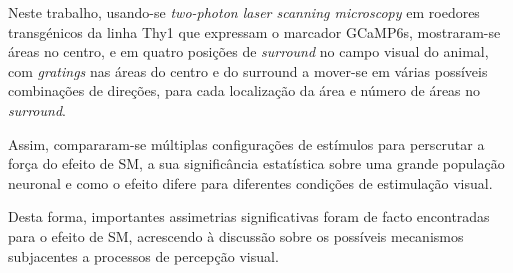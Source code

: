 Neste trabalho, usando-se \textit{two-photon laser scanning microscopy} em roedores transgénicos da linha Thy1 que expressam o marcador GCaMP6s,  mostraram-se áreas no centro, e em quatro posições de \textit{surround} no campo visual do animal, com \textit{gratings} nas áreas do centro e do surround a mover-se em várias possíveis combinações de direções, para cada localização da área e número de áreas no \textit{surround}.

Assim, compararam-se múltiplas configurações de estímulos para perscrutar a força do efeito de SM, a sua significância estatística sobre uma grande população neuronal e como o efeito difere para diferentes condições de estimulação visual.

Desta forma, importantes assimetrias significativas foram de facto encontradas para o efeito de SM, acrescendo à discussão sobre os possíveis mecanismos subjacentes a processos de percepção visual.

